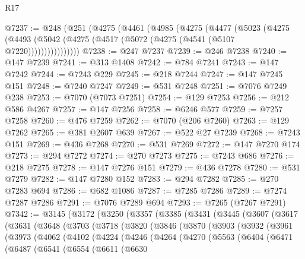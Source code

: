 \begin{lexlean}{R17}
\begin{coremodule}
@7237 := @248
    (@251
      (@4275
        (@4461
          (@4985
            (@4275
              (@4477
                (@5023
                  (@4275
                    (@4493 (@5042 (@4275 (@4517 (@5072 (@4275 (@4541 (@5107 @7220))))))))))))))))
@7238 := @247 @7237
@7239 := @246 @7238
@7240 := @147 @7239
@7241 := @313 @1408
@7242 := @784 @7241
@7243 := @147 @7242
@7244 := @7243 @229
@7245 := @218 @7244
@7247 := @147 @7245 @151
@7248 := @7240 @7247
@7249 := @531 @7248
@7251 := @7076 @7249 @238
@7253 := @7070 (@7073 @7251)
@7254 := @129 @7253
@7256 := @212 @586 @4267
@7257 := @147 @7256
@7258 := @6246 @577
@7259 := @7257 @7258
@7260 := @476 @7259
@7262 := @7070 (@206 @7260)
@7263 := @129 @7262
@7265 := @381 @2607 @639
@7267 := @522 @27 @7239
@7268 := @7243 @151
@7269 := @436 @7268
@7270 := @531 @7269
@7272 := @147 @7270 @174
@7273 := @294 @7272
@7274 := @270 @7273
@7275 := @7243 @686
@7276 := @218 @7275
@7278 := @147 @7276 @151
@7279 := @436 @7278
@7280 := @531 @7279
@7282 := @147 @7280 @152
@7283 := @294 @7282
@7285 := @270 @7283 @694
@7286 := @682 @1086
@7287 := @7285 @7286
@7289 := @7274 @7287 @7286
@7291 := @7076 @7289 @694
@7293 := @7265 (@7267 @7291)
@7342 := @3145
    (@3172
      (@3250
        (@3357
          (@3385
            (@3431
              (@3445
                (@3607
                  (@3617
                    (@3631
                      (@3648
                        (@3703
                          (@3718
                            (@3820
                              (@3846
                                (@3870
                                  (@3903
                                    (@3932
                                      (@3961
                                        (@3973
                                          (@4062
                                            (@4102
                                              (@4224
                                                (@4246
                                                  (@4264
                                                    (@4270
                                                      (@5563
                                                        (@6404
                                                          (@6471
                                                            (@6487
                                                              (@6541
                                                                (@6554
                                                                  (@6611
                                                                    (@6630

\end{coremodule}
\end{lexlean}
